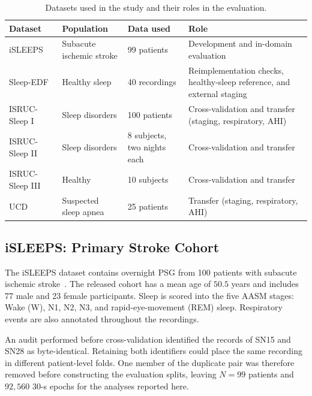 \documentclass{ieeeaccess}
\begin{document}
\begin{table}[t]
\caption{Datasets used in the study and their roles in the evaluation.}
\label{tab:datasets}
\centering
\small
\setlength{\tabcolsep}{4pt}
\begin{tabular}{p{} p{}
                p{} p{}}
\toprule
Dataset & Population & Data used & Role \\
\midrule
iSLEEPS~\cite{maiti2026isleeps}
& Subacute ischemic stroke
& 99 patients
& Development and in-domain evaluation \\

Sleep-EDF~\cite{kemp2000sleepedf,goldberger2000physionet}
& Healthy sleep
& 40 recordings
& Reimplementation checks, healthy-sleep reference, and external staging \\

ISRUC-Sleep I~\cite{khalighi2016isruc}
& Sleep disorders
& 100 patients
& Cross-validation and transfer (staging, respiratory, AHI) \\

ISRUC-Sleep II~\cite{khalighi2016isruc}
& Sleep disorders
& 8 subjects, two nights each
& Cross-validation and transfer \\

ISRUC-Sleep III~\cite{khalighi2016isruc}
& Healthy
& 10 subjects
& Cross-validation and transfer \\

UCD~\cite{ucddb2007}
& Suspected sleep apnea
& 25 patients
& Transfer (staging, respiratory, AHI) \\
\bottomrule
\end{tabular}
\end{table}

\subsection{iSLEEPS: Primary Stroke Cohort}

The iSLEEPS dataset contains overnight PSG from 100 patients with subacute
ischemic stroke~\cite{maiti2026isleeps}. The released cohort has a mean age of
$50.5$ years and includes 77 male and 23 female participants. Sleep is scored
into the five AASM stages: Wake (W), N1, N2, N3, and rapid-eye-movement (REM)
sleep. Respiratory events are also annotated throughout the recordings.

An audit performed before cross-validation identified the records of SN15 and
SN28 as byte-identical. Retaining both identifiers could place the same
recording in different patient-level folds. One member of the duplicate pair
was therefore removed before constructing the evaluation splits, leaving
$N=99$ patients and $92{,}560$ 30-s epochs for the analyses reported here.
\end{document}
